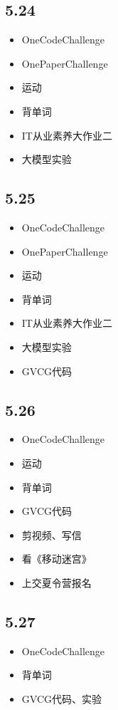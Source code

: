 \documentclass[UTF8]{ctexart}
\begin{document}
\subsection*{5.24}
\begin{itemize}
    \item OneCodeChallenge
    \item OnePaperChallenge
    \item 运动
    \item 背单词
    \item IT从业素养大作业二
    \item 大模型实验
\end{itemize}

\subsection*{5.25}
\begin{itemize}
    \item OneCodeChallenge
    \item OnePaperChallenge
    \item 运动
    \item 背单词
    \item IT从业素养大作业二
    \item 大模型实验
    \item GVCG代码
\end{itemize}

\subsection*{5.26}
\begin{itemize}
    \item OneCodeChallenge
    \item 运动
    \item 背单词
    \item GVCG代码
    \item 剪视频、写信
    \item 看《移动迷宫》
    \item 上交夏令营报名
\end{itemize}

\subsection*{5.27}
\begin{itemize}
    \item OneCodeChallenge
    \item 背单词
    \item GVCG代码、实验
\end{itemize}
\end{document}
